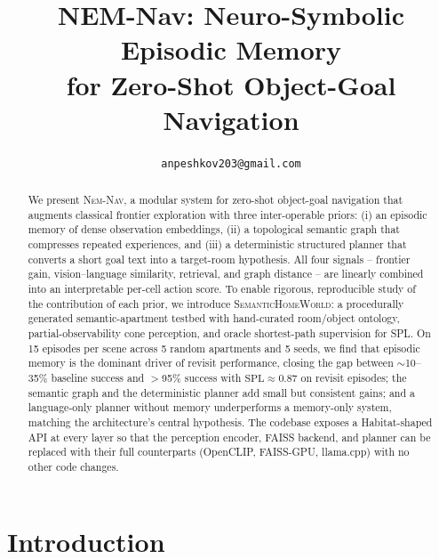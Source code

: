\documentclass[conference,a4paper,10pt]{IEEEtran}
\begin{document}
\title{NEM-Nav: Neuro-Symbolic Episodic Memory\\for Zero-Shot Object-Goal Navigation}

\author{
\texttt{anpeshkov203@gmail.com}}

\maketitle

\begin{abstract}
We present \textsc{Nem-Nav}, a modular system for zero-shot object-goal
navigation that augments classical frontier exploration with three
inter-operable priors: (i) an episodic memory of dense observation
embeddings, (ii) a topological semantic graph that compresses repeated
experiences, and (iii) a deterministic structured planner that converts a
short goal text into a target-room hypothesis. All four signals --
frontier gain, vision--language similarity, retrieval, and graph
distance -- are linearly combined into an interpretable per-cell action
score. To enable rigorous, reproducible study of the contribution of
each prior, we introduce \textsc{SemanticHomeWorld}: a procedurally
generated semantic-apartment testbed with hand-curated room/object
ontology, partial-observability cone perception, and oracle shortest-path
supervision for SPL. On 15 episodes per scene across 5 random apartments
and 5 seeds, we find that episodic memory is the dominant driver of revisit performance, closing the gap between
$\sim$10--35\% baseline success and $>$95\% success with
$\textrm{SPL}\approx0.87$ on revisit episodes; the semantic graph and the
deterministic planner add small but consistent gains; and a
language-only planner without memory underperforms a memory-only system,
matching the architecture's central hypothesis. The codebase exposes a
Habitat-shaped API at every layer so that the perception encoder, FAISS
backend, and planner can be replaced with their full counterparts
(OpenCLIP, FAISS-GPU, llama.cpp) with no other code changes.
\end{abstract}

\section{Introduction}
\end{document}
